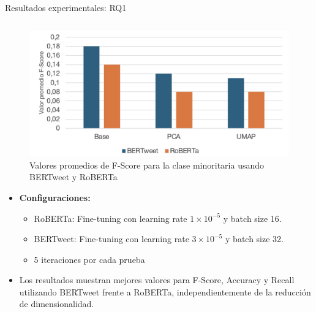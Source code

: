 \documentclass[final]{beamer}
\newlength{\onecolwid}
\newlength{\twocolwid}
\begin{document}
\begin{frame}[t]
\begin{columns}[t]
\begin{column}{\twocolwid}
\begin{columns}[t,totalwidth=\twocolwid]
\begin{column}{\twocolwid}
\begin{block}{Resultados experimentales: RQ1}
\begin{column}{\onecolwid}
                \begin{figure}
                    \centering
                    \includegraphics[width=1\linewidth]{bertweet-roberta.png}
                    \caption{Valores promedios de F-Score para la clase minoritaria usando BERTweet y RoBERTa}
                    \label{fig:bertweet-roberta}
                \end{figure}
                \begin{itemize}
                \item \textbf{Configuraciones:} 
                \begin{itemize}
                    \item RoBERTa: Fine-tuning con learning rate $1\times10^{-5}$ y batch size 16.
                    \item BERTweet: Fine-tuning con learning rate $3\times10^{-5}$ y batch size 32.
                    \item 5 iteraciones por cada prueba
                \end{itemize}
                \item Los resultados muestran mejores valores para F-Score, Accuracy y Recall utilizando BERTweet frente a RoBERTa, independientemente de la reducción de dimensionalidad.
            \end{itemize}
                \end{column} %
                \begin{column}{\onecolwid} %
                \begin{table}[ht]
                \centering
                \begin{tabular}{|l|l|c|}

\end{tabular}
\end{table}
\end{column}
\end{block}
\end{column}
\end{columns}
\end{column}
\end{columns}
\end{frame}
\end{document}
